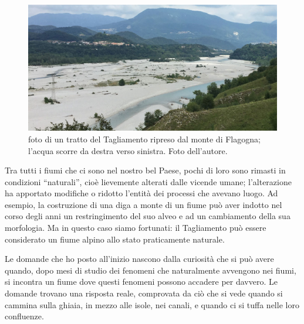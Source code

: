 \begin{figure}
	\centering
	\includegraphics[width=\textwidth]{files/foto_terrazzo_valle_pinzano.jpg}
	\caption[foto di un tratto del Tagliamento ripreso dal monte di Flagogna]{foto di un tratto del Tagliamento ripreso dal monte di Flagogna; l'acqua scorre da destra verso sinistra. Foto dell'autore.
	}
	\label{fig:foto-pinzano}
\end{figure}


Tra tutti i fiumi che ci sono nel nostro bel Paese, pochi di loro sono rimasti in condizioni “naturali”, cioè lievemente alterati dalle vicende umane; l'alterazione ha apportato modifiche o ridotto l'entità dei processi che avevano luogo. 
Ad esempio, la costruzione di una diga a monte di un fiume può aver indotto nel corso degli anni un restringimento del suo alveo e ad un cambiamento della sua morfologia.
Ma in questo caso siamo fortunati: il Tagliamento può essere considerato un fiume alpino allo stato praticamente naturale.

Le domande che ho posto all'inizio nascono dalla curiosità che si può avere quando, dopo mesi di studio dei fenomeni che naturalmente avvengono nei fiumi, si incontra un fiume dove questi fenomeni possono accadere per davvero. Le domande trovano una risposta reale, comprovata da ciò che si vede quando si cammina sulla ghiaia, in mezzo alle isole, nei canali, e quando ci si tuffa nelle loro confluenze.

